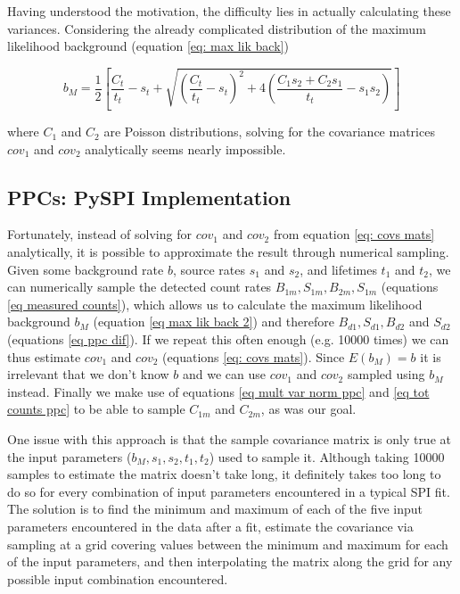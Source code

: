 \documentclass{report}
\begin{document}
Having understood the motivation, the difficulty lies in actually calculating these variances. Considering the already complicated distribution of the maximum likelihood background (equation \ref{eq: max lik back})

\begin{equation}\label{eq max lik back 2}
  b_M = \frac{1}{2} \left[ \frac{C_t}{t_t} - s_t + \sqrt{\left( \frac{C_t}{t_t} - s_t\right)^2 + 4 \left( \frac{C_1s_2+C_2s_1}{t_t}-s_1s_2\right)}\right]
\end{equation}

where $C_1$ and $C_2$ are Poisson distributions, solving for the covariance matrices $cov_1$ and $cov_2$ analytically seems nearly impossible.


\subsection{PPCs: PySPI Implementation}

Fortunately, instead of solving for $cov_1$ and $cov_2$ from equation \ref{eq: covs mats} analytically, it is possible to approximate the result through numerical sampling. Given some background rate $b$, source rates $s_1$ and $s_2$, and lifetimes $t_1$ and $t_2$, we can numerically sample the detected count rates $B_{1m}, S_{1m}, B_{2m}, S_{1m}$ (equations \ref{eq measured counts}), which allows us to calculate the maximum likelihood background $b_M$ (equation \ref{eq max lik back 2}) and therefore $B_{d1},S_{d1},B_{d2}$ and $S_{d2}$ (equations \ref{eq ppc dif}). If we repeat this often enough (e.g. 10000 times) we can thus estimate $cov_1$ and $cov_2$ (equations \ref{eq: covs mats}). Since $E(b_M) = b$ it is irrelevant that we don't know $b$ and we can use $cov_1$ and $cov_2$ sampled using $b_M$ instead. Finally we make use of equations \ref{eq mult var norm ppc} and \ref{eq tot counts ppc} to be able to sample $C_{1m}$ and $C_{2m}$, as was our goal.

One issue with this approach is that the sample covariance matrix is only true at the input parameters ($b_M,s_1,s_2,t_1,t_2$) used to sample it. Although taking 10000 samples to estimate the matrix doesn't take long, it definitely takes too long to do so for every combination of input parameters encountered in a typical SPI fit. The solution is to find the minimum and maximum of each of the five input parameters encountered in the data after a fit, estimate the covariance via sampling at a grid covering values between the minimum and maximum for each of the input parameters, and then interpolating the matrix along the grid for any possible input combination encountered. 
\end{document}
